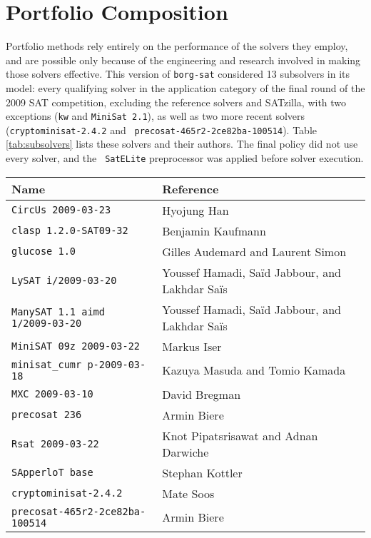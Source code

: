 \section{\label{sec:subsolvers}Portfolio Composition}

Portfolio methods rely entirely on the performance of the solvers they employ,
and are possible only because of the engineering and research involved in
making those solvers effective. This version of {\tt borg-sat} considered 13
subsolvers in its model: every qualifying solver in the application category of
the final round of the 2009 SAT competition, excluding the reference solvers
and SATzilla, with two exceptions ({\tt kw} and {\tt MiniSat 2.1}), as well as
two more recent solvers ({\tt cryptominisat-2.4.2} and {\tt
precosat-465r2-2ce82ba-100514}). Table \ref{tab:subsolvers} lists these solvers
and their authors. The final policy did not use every solver, and the {\tt
SatELite} preprocessor was applied before solver execution.

\begin{table*}
\begin{center}
\begin{tabular}{lll}
\toprule
{\bf Name}         & {\bf Reference}\\
\midrule
{\tt CircUs 2009-03-23}             & Hyojung Han\\
{\tt clasp 1.2.0-SAT09-32}          & Benjamin Kaufmann\\
{\tt glucose 1.0}                   & Gilles Audemard and Laurent Simon\\
{\tt LySAT i/2009-03-20}            & Youssef Hamadi, Sa\"{i}d Jabbour, and Lakhdar Sa\"{i}s\\
{\tt ManySAT 1.1 aimd 1/2009-03-20} & Youssef Hamadi, Sa\"{i}d Jabbour, and Lakhdar Sa\"{i}s\\
{\tt MiniSAT 09z 2009-03-22}        & Markus Iser\\
{\tt minisat\_cumr p-2009-03-18}    & Kazuya Masuda and Tomio Kamada\\
{\tt MXC 2009-03-10}                & David Bregman\\
{\tt precosat 236}                  & Armin Biere\\
{\tt Rsat 2009-03-22}               & Knot Pipatsrisawat and Adnan Darwiche\\
{\tt SApperloT base}                & Stephan Kottler\\
{\tt cryptominisat-2.4.2}           & Mate Soos\\
{\tt precosat-465r2-2ce82ba-100514} & Armin Biere\\
\bottomrule
\end{tabular}
\caption{\label{tab:subsolvers}Subsolvers considered by the {\tt
borg-sat-10.06.07} planner.}
\end{center}
\end{table*}

